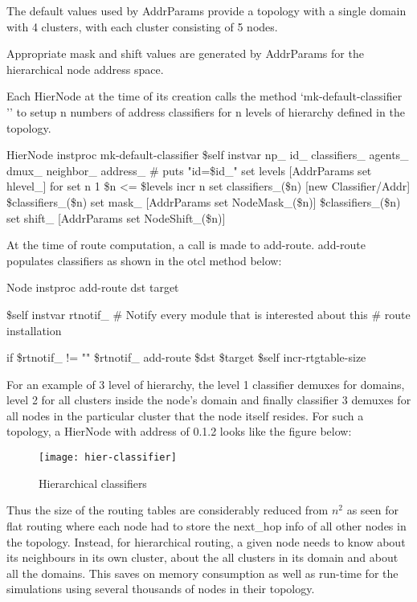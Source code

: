 The default values used by AddrParams provide a topology with a single
domain with 4 clusters, with each cluster consisting of 5 nodes.

Appropriate mask and shift values are generated by AddrParams for the
hierarchical node address space.

Each HierNode at the time of its creation calls the method
`mk-default-classifier '' to setup n numbers of address
classifiers for n levels of hierarchy defined in the topology.

\begin{program}
  HierNode instproc mk-default-classifier {} {
    \$self instvar np_ id_ classifiers_ agents_ dmux_ neighbor_ address_ 
    # puts "id=\$id_"
    set levels [AddrParams set hlevel_]
    for {set n 1} {\$n <= \$levels} {incr n} {
      set classifiers_(\$n) [new Classifier/Addr]
      \$classifiers_(\$n) set mask_ [AddrParams set NodeMask_(\$n)]
      \$classifiers_(\$n) set shift_ [AddrParams set NodeShift_(\$n)]
      }
    }
\end{program}

At the time of route computation, a call is made to add-route.
add-route populates classifiers as shown in the otcl method below:

\begin{program}
Node instproc add-route { dst target } {
 	\$self instvar rtnotif_
	# Notify every module that is interested about this 
	# route installation
	
	if {\$rtnotif_ != ""} {
		\$rtnotif_ add-route \$dst \$target
	}
	\$self incr-rtgtable-size
}
\end{program}

For an example of 3 level of hierarchy, the level 1 classifier demuxes
for domains, level 2 for all clusters inside the node's domain and
finally classifier 3 demuxes for all nodes in the particular cluster
that the node itself resides. For such a topology, a HierNode with
address of 0.1.2 looks like the figure below:
\begin{figure}[tb]
\centerline{\texttt{[image: hier-classifier]}}
\caption{Hierarchical classifiers}
\label{fig:hier-classifier}
\end{figure}

Thus the size of the routing tables are considerably reduced from 
$n^{2}$ as seen for flat routing where each node had to store the
  next\_hop info of all other nodes in the topology. Instead, for
  hierarchical routing, a given node needs to know about its neighbours
  in its own cluster, about the all clusters in its domain and about all
  the domains. This saves on memory consumption as well as run-time for
  the simulations using several thousands of nodes in their topology.


